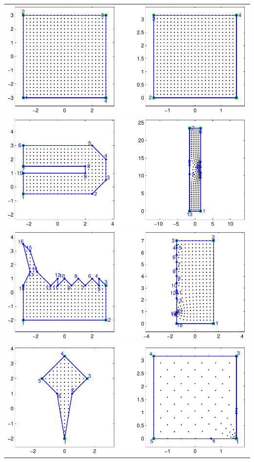 \documentclass[a4paper,10pt]{amsart}
\begin{document}
\begin{table}
\centering
\begin{tabular}{c}  
\includegraphics[scale=0.5]{figs/matlab-test-1.pdf} \\
\includegraphics[scale=0.5]{figs/matlab-test-2.pdf} \\
\includegraphics[scale=0.5]{figs/matlab-test-3.pdf} \\
\includegraphics[scale=0.5]{figs/matlab-test-4.pdf} \\

\end{tabular}
\end{table}
\end{document}
